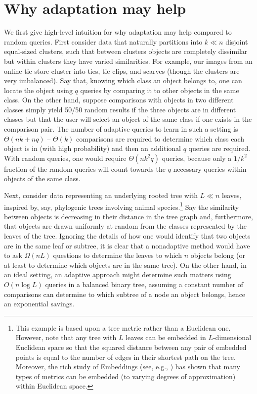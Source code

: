 \documentclass{article}
\begin{document}
\section{Why adaptation may help}
We first give high-level intuition for why adaptation may help compared to random queries.  First consider data that naturally partitions into $k \ll n$ disjoint equal-sized clusters, such that between clusters objects are completely dissimilar but within clusters they have varied similarities.  For example, our images from an online tie store cluster into ties, tie clips, and scarves (though the clusters are very imbalanced).  Say that, knowing which class an object belongs to, one can locate the object using $q$ queries by comparing it to other objects in the same class.  On the other hand, suppose comparisons with objects in two different classes simply yield 50/50 random results if the three objects are in different classes but that the user will select an object of the same class if one exists in the comparison pair.  The number of adaptive queries to learn in such a setting is $\Theta(nk+nq)$ -- $\Theta(k)$ comparisons are required to determine which class each object is in (with high probability) and then an additional $q$ queries are required.  With random queries, one would require $\Theta(n k^2 q)$ queries, because only a $1/k^2$ fraction of the random queries will count towards the $q$ necessary queries within objects of the same class.


Next, consider data representing an underlying rooted tree with $L \ll n$ leaves, inspired by, say, phylogenic trees involving animal species.\footnote{This example is based upon a tree metric rather than a Euclidean one.  However, note that any tree with $L$ leaves can be embedded in $L$-dimensional Euclidean space so that the squared distance between any pair of embedded points is equal to the number of edges in their shortest path on the tree.  Moreover, the rich study of Embeddings (see, e.g., \citealp{IM04}) has shown that many types of metrics can be embedded (to varying degrees of approximation) within Euclidean space.}  Say the similarity between objects is decreasing in their distance in the tree graph and, furthermore, that objects are drawn uniformly at random from the classes represented by the leaves of the tree.  Ignoring the details of how one would identify that two objects are in the same leaf or subtree, it is clear that a nonadaptive method would have to ask $\Omega(n L)$ questions to determine the leaves to which $n$ objects belong (or at least to determine which objects are in the same tree).  On the other hand, in an ideal setting, an adaptive approach might determine such matters using $O(n \log L)$ queries in a balanced binary tree, assuming a constant number of comparisons can determine to which subtree of a node an object belongs, hence an exponential savings.
\end{document}
